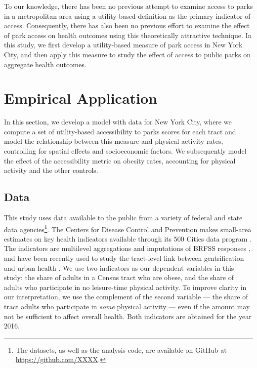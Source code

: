 \documentclass[shortAfour,sageh.bst]{sagej}
\begin{document}
To our knowledge, there has been no previous attempt to examine access
to parks in a metropolitan area using a utility-based definition as the
primary indicator of access. Consequently, there has also been no
previous effort to examine the effect of park access on health outcomes
using this theoretically attractive technique. In this study, we first
develop a utility-based measure of park access in New York City, and
then apply this measure to study the effect of access to public parks on
aggregate health outcomes.

\hypertarget{empirical-application}{%
\section{Empirical Application}\label{empirical-application}}

In this section, we develop a model with data for New York City, where
we compute a set of utility-based accessibility to parks scores for each
tract and model the relationship between this measure and physical
activity rates, controlling for spatial effects and socioeconomic
factors. We subsequently model the effect of the accessibility metric on
obesity rates, accounting for physical activity and the other controls.

\hypertarget{data}{%
\subsection{Data}\label{data}}

This study uses data available to the public from a variety of federal
and state data agencies\footnote{The datasets, as well as the analysis
  code, are available on GitHub at
  \url{https://github.com/XXXX}.}. The Centers
for Disease Control and Prevention makes small-area estimates on key
health indicators available through its 500 Cities data program
\citep{CDC5002016}. The indicators are multilevel aggregations and
imputations of BRFSS responses \citep{Wang2018, Wang2017}, and have been
recently used to study the tract-level link between gentrification and
urban health \citep{Gibbons2018}. We use two indicators as our dependent
variables in this study: the share of adults in a Census tract who are
obese, and the share of adults who participate in no leisure-time
physical activity. To improve clarity in our interpretation, we use the
complement of the second variable --- the share of tract adults who
participate in \emph{some} physical activity --- even if the amount may
not be sufficient to affect overall health. Both indicators are obtained
for the year 2016.
\end{document}
